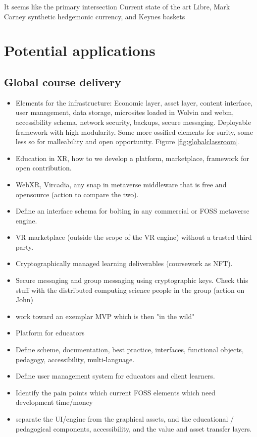 \documentclass[
	11pt, %
	fleqn, %
	a4paper, %
]{LegrandOrangeBook}
\begin{document}
It seems like the primary intersection 
Current state of the art 
Libre, Mark Carney synthetic hedgemonic currency, and Keynes baskets

\section{Potential applications }
\lipsum[50]
\subsection{Global course delivery}
\begin{itemize}
\item Elements for the infrastructure: Economic layer, asset layer, content interface, user management, data storage, microsites loaded in Wolvin and webm, accessibility schema, network security, backups, secure messaging. Deployable framework with high modularity. Some more ossified elements for surity, some less so for malleability and open opportunity. Figure \ref{fig:globalclassroom}.
\item Education in XR, how to we develop a platform, marketplace, framework for open contribution.
\item WebXR, Vircadia, any snap in metaverse middleware that is free and opensource (action to compare the two). 
\item Define an interface schema for bolting in any commercial or FOSS metaverse engine.
\item VR marketplace (outside the scope of the VR engine) without a trusted third party.
\item Cryptographically managed learning deliverables (coursework as NFT). 
\item Secure messaging and group messaging using cryptographic keys. Check this stuff with the distributed computing science people in the group (action on John)
\item work toward an exemplar MVP which is then "in the wild"
\item Platform for educators
\item Define scheme, documentation, best practice, interfaces, functional objects, pedagogy, accessibility, multi-language. 
\item Define user management system for educators and client learners.
\item Identify the pain points which current FOSS elements which need development time/money
\item separate the UI/engine from the graphical assets, and the educational / pedagogical components, accessibility, and the value and asset transfer layers.

\end{itemize}
\end{document}
